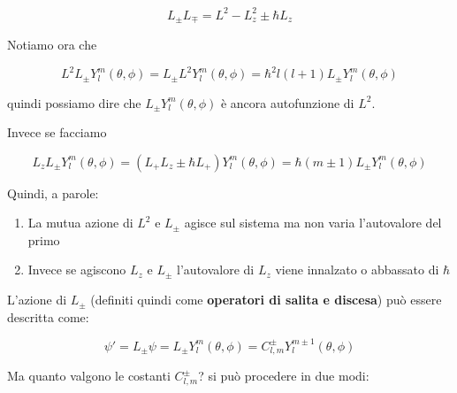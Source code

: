\begin{equation}
L_\pm L_\mp = L^2 - L_z^2 \pm \hbar L_z
\end{equation}

Notiamo ora che 


\begin{equation}
L^2 L_\pm Y_l^m(\theta, \phi)= L_\pm L^2 Y_l^m(\theta, \phi) = \hbar^2l(l+1) L_\pm Y_l^m(\theta, \phi)
\end{equation}


quindi possiamo dire che $L_\pm Y_l^m(\theta, \phi)$ è ancora autofunzione di $L^2$.

Invece se facciamo

\begin{equation}
L_z L_\pm Y_l^m(\theta, \phi)= (L_+ L_z \pm \hbar L_+)Y_l^m(\theta, \phi) = \hbar (m \pm 1) L_\pm Y_l^m(\theta, \phi) 
\end{equation}


Quindi, a parole:

\begin{enumerate}
	\item La mutua azione di $L^2$ e $L_\pm$ agisce sul sistema ma non varia l'autovalore del primo
	\item Invece se agiscono $L_z$ e $L_\pm$ l'autovalore di $L_z$ viene innalzato o abbassato di $\hbar$
\end{enumerate}

L'azione di $L_\pm$ (definiti quindi come \textbf{operatori di salita e discesa}) può essere descritta come:

\begin{equation}
\psi ' = L_\pm \psi = L_\pm Y_l^m(\theta, \phi) = C_{l,m}^\pm Y_l^{m \pm 1}(\theta, \phi)
\end{equation}

Ma quanto valgono le costanti $C_{l,m}^\pm$? si può procedere in due modi: 


